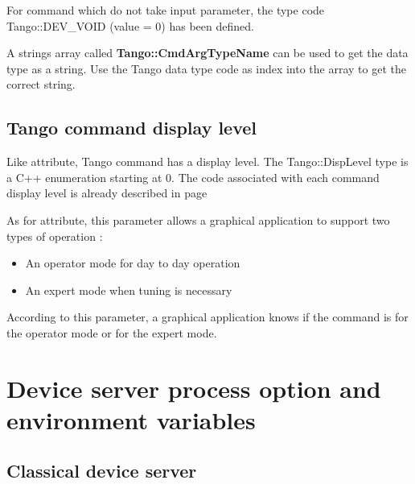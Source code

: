 \vspace{0.3cm}

For command which do not take input parameter, the type code Tango::DEV\_VOID
(value = 0) has been defined.

A strings array called \textbf{Tango::CmdArgTypeName}
can be used to get the data type as a string. Use the Tango data type
code as index into the array to get the correct string.

\subsection{Tango command display level}

Like attribute, Tango command has a display level. The Tango::DispLevel
type is a C++ enumeration starting at 0. The code associated with
each command display level is already described in page \pageref{display level}

As for attribute, this parameter allows a graphical application to
support two types of operation :
\begin{itemize}
\item An operator mode for day to day operation
\item An expert mode when tuning is necessary
\end{itemize}
According to this parameter, a graphical application knows if the
command is for the operator mode or for the expert mode.

\section{Device server process option and environment variables}

\subsection{Classical device server}

